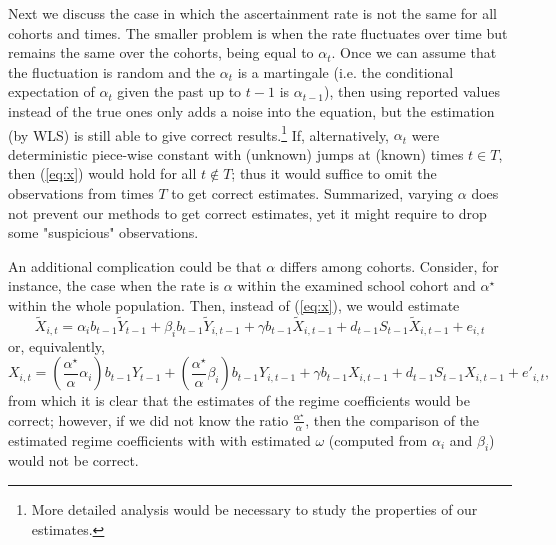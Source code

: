 \documentclass[fleqn,10pt]{wlscirep}
\begin{document}
Next we discuss the case in which the ascertainment rate is not the same for all cohorts and times. The smaller problem is when the rate fluctuates over time but remains the same over the cohorts, being equal to $\alpha_t$. Once we can assume that the fluctuation is random and the $\alpha_t$ is a martingale (i.e. the conditional expectation of $\alpha_t$ given the past up to $t-1$ is $\alpha_{t-1}$), then using reported values instead of the true ones only adds a noise into the equation, but the estimation (by WLS) is still able to give correct results.\footnote{More detailed analysis would be necessary to study the properties of our estimates.} If, alternatively, $\alpha_t$ were deterministic piece-wise constant with (unknown) jumps at (known) times $t\in T$, then (\ref{eq:x}) would hold for all $t\notin T$; thus it would suffice to omit the observations from times $T$ to get correct estimates. Summarized, varying $\alpha$ does not prevent our methods to get correct estimates, yet it might require to drop some "suspicious" observations.

An additional complication could be that $\alpha$ differs among cohorts. Consider, for instance, the case when the rate is $\alpha$ within the examined school cohort and $\alpha^\star$ within the whole population. Then, instead of (\ref{eq:x}), we would estimate
$$
\tilde X_{i,t}  = \alpha_i b_{t-1} \tilde Y_{t-1} + \beta_i b_{t-1}  \tilde Y_{i,t-1} + \gamma b_{t-1} \tilde X_{i,t-1}
+ d_{t-1} S_{t-1} \tilde X_{i,t-1} + e_{i,t}
$$
or, equivalently,
$$
X_{i,t} = (\frac{\alpha^\star}\alpha
\alpha_i) b_{t-1} Y_{t-1} + (\frac{\alpha^\star}\alpha \beta_i) b_{t-1}  Y_{i,t-1} + \gamma b_{t-1}  X_{i,t-1}
+ d_{t-1} S_{t-1}  X_{i,t-1} + e'_{i,t},
$$
from which it is clear that the estimates of the regime coefficients would be correct; however, if we did not know the ratio $\frac{\alpha^\star}{\alpha}$, then the comparison of the estimated regime coefficients with with estimated $\omega$ (computed from $\alpha_i$ and $\beta_i$) would not be correct.
\end{document}
